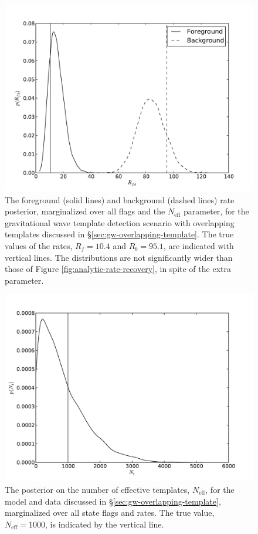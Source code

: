 \documentclass[aps,prd]{revtex4-1}
\begin{document}
\begin{figure}
  \includegraphics[width=\columnwidth]{rates-nt}
  \caption{\label{fig:rates-nt} The foreground (solid lines) and
    background (dashed lines) rate posterior, marginalized over all
    flags and the $N_\mathrm{eff}$ parameter, for the gravitational
    wave template detection scenario with overlapping templates
    discussed in \S \ref{sec:gw-overlapping-template}.  The true
    values of the rates, $R_f = 10.4$ and $R_b=95.1$, are indicated
    with vertical lines.  The distributions are not significantly
    wider than those of Figure \ref{fig:analytic-rate-recovery}, in
    spite of the extra parameter.}
\end{figure}

\begin{figure}
  \includegraphics[width=\columnwidth]{ntemplates}
  \caption{\label{fig:ntemplates} The posterior on the number of
    effective templates, $N_\mathrm{eff}$, for the model and data
    discussed in \S \ref{sec:gw-overlapping-template}, marginalized
    over all state flags and rates.  The true value, $N_\mathrm{eff} =
    1000$, is indicated by the vertical line.}
\end{figure}
\end{document}
